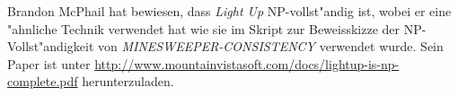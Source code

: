 \begin{diskussion}
Brandon McPhail hat bewiesen, dass {\em Light Up} NP-vollst"andig ist,
wobei er eine "ahnliche Technik verwendet hat wie sie im Skript zur
Beweisskizze der NP-Vollst"andigkeit von \textsl{MINESWEEPER-CONSISTENCY}
verwendet wurde.
Sein Paper ist unter
\url{http://www.mountainvistasoft.com/docs/lightup-is-np-complete.pdf}
herunterzuladen.
\end{diskussion}
